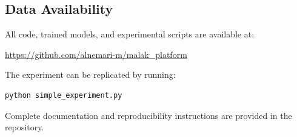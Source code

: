 \subsection*{Data Availability}

All code, trained models, and experimental scripts are available at:
\begin{center}
\url{https://github.com/alnemari-m/malak_platform}
\end{center}

The experiment can be replicated by running:
\begin{verbatim}
python simple_experiment.py
\end{verbatim}

Complete documentation and reproducibility instructions are provided in the repository.
